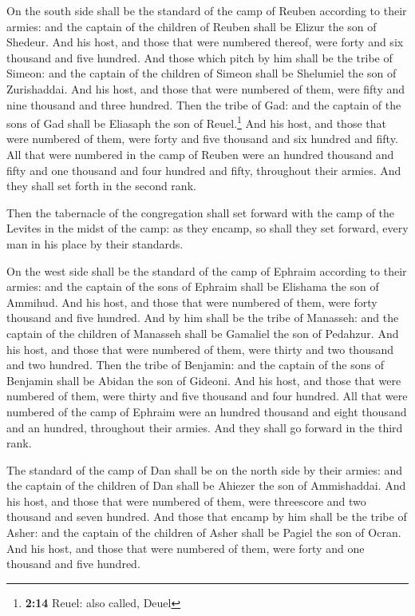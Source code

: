  On the south side shall be the standard of the camp of
Reuben according to their armies: and the captain of the children of
Reuben shall be Elizur the son of Shedeur.  And his host,
and those that were numbered thereof, were forty and six thousand and
five hundred.  And those which pitch by him shall be the
tribe of Simeon: and the captain of the children of Simeon shall be
Shelumiel the son of Zurishaddai.  And his host, and
those that were numbered of them, were fifty and nine thousand and three
hundred.  Then the tribe of Gad: and the captain of the
sons of Gad shall be Eliasaph the son of Reuel.\footnote{\textbf{2:14}
  Reuel: also called, Deuel}  And his host, and those
that were numbered of them, were forty and five thousand and six hundred
and fifty.  All that were numbered in the camp of Reuben
were an hundred thousand and fifty and one thousand and four hundred and
fifty, throughout their armies. And they shall set forth in the second
rank.

 Then the tabernacle of the congregation shall set
forward with the camp of the Levites in the midst of the camp: as they
encamp, so shall they set forward, every man in his place by their
standards.

 On the west side shall be the standard of the camp of
Ephraim according to their armies: and the captain of the sons of
Ephraim shall be Elishama the son of Ammihud.  And his
host, and those that were numbered of them, were forty thousand and five
hundred.  And by him shall be the tribe of Manasseh: and
the captain of the children of Manasseh shall be Gamaliel the son of
Pedahzur.  And his host, and those that were numbered of
them, were thirty and two thousand and two hundred.  Then
the tribe of Benjamin: and the captain of the sons of Benjamin shall be
Abidan the son of Gideoni.  And his host, and those that
were numbered of them, were thirty and five thousand and four hundred.
 All that were numbered of the camp of Ephraim were an
hundred thousand and eight thousand and an hundred, throughout their
armies. And they shall go forward in the third rank.

 The standard of the camp of Dan shall be on the north
side by their armies: and the captain of the children of Dan shall be
Ahiezer the son of Ammishaddai.  And his host, and those
that were numbered of them, were threescore and two thousand and seven
hundred.  And those that encamp by him shall be the tribe
of Asher: and the captain of the children of Asher shall be Pagiel the
son of Ocran.  And his host, and those that were numbered
of them, were forty and one thousand and five hundred.

